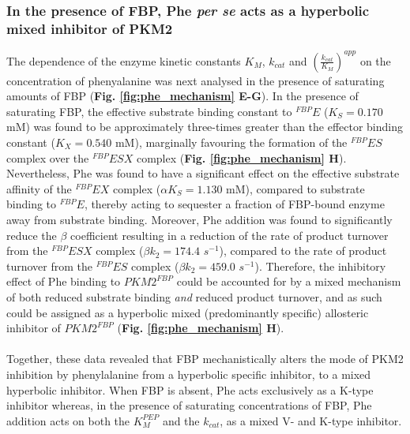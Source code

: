 \subsubsection{In the presence of FBP, Phe \textit{per se} acts as a hyperbolic mixed  inhibitor of PKM2}
The dependence of the enzyme kinetic constants $K_{M}$, $k_{cat}$ and $(\frac{k_{cat}}{K_{M}})^{app}$ on the concentration of phenyalanine was next analysed in the presence of saturating amounts of FBP (\textbf{Fig. \ref{fig:phe_mechanism} E-G}). In the presence of saturating FBP, the effective substrate binding constant to $^{FBP}E$ ($K_{S} = 0.170$  mM) was found to be approximately three-times greater than the effector binding constant ($K_{X} = 0.540$ mM), marginally favouring the formation of the $^{FBP}ES$ complex over the $^{FBP}ESX$ complex (\textbf{Fig. \ref{fig:phe_mechanism} H}). Nevertheless, Phe was found to have a significant effect on the effective substrate affinity of the $^{FBP}EX$ complex ($\alpha K_{S} = 1.130$ mM), compared to substrate binding to $^{FBP}E$, thereby acting to sequester a fraction of FBP-bound enzyme away from substrate binding. Moreover, Phe addition was found to significantly reduce the $\beta$ coefficient resulting in a reduction of the rate of product turnover from the $^{FBP}ESX$ complex ($\beta k_2 = 174.4$ $s^{-1}$), compared to the rate of product turnover from the $^{FBP}ES$ complex ($\beta k_2 = 459.0$ $s^{-1}$). Therefore, the inhibitory effect of Phe binding to $PKM2^{FBP}$ could be accounted for by a mixed mechanism of both reduced substrate binding \textit{and} reduced product turnover, and as such could be assigned as a hyperbolic mixed (predominantly specific) allosteric inhibitor of $PKM2^{FBP}$ (\textbf{Fig. \ref{fig:phe_mechanism} H}). 
%
\\\\
%
Together, these data revealed that FBP mechanistically alters the mode of PKM2 inhibition by phenylalanine from a hyperbolic specific inhibitor, to a mixed hyperbolic inhibitor. When FBP is absent, Phe acts exclusively as a K-type inhibitor whereas, in the presence of saturating concentrations of FBP, Phe addition acts on both the $K_{M}^{PEP}$ and the $k_{cat}$, as a mixed V- and K-type inhibitor.
%
%
%
